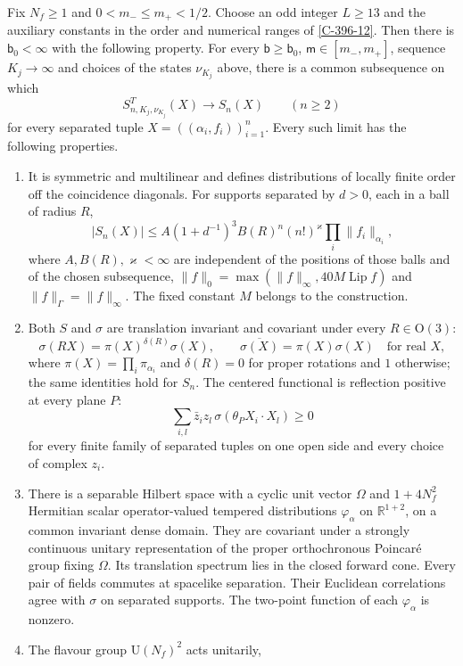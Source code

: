 \documentclass[11pt,letterpaper,reqno]{amsart}
\makeatletter
\theoremstyle{definition}
\newcommand{\ms@majorstart}{%
  \pushQED{\qed}\renewcommand{\qedsymbol}{$\blacksquare\square$}}
\newenvironment{theorem}[1][]{\ms@majorstart\ms@theorem[#1]}
  {\popQED\endms@theorem}
\theoremstyle{remark}
\makeatother
\begin{document}
\begin{theorem}[The massive two-colour theory]\label{C-396-28}
Fix $N_f\ge1$ and $0<m_-\le m_+<1/2$. Choose an odd
integer $L\ge13$ and the auxiliary constants in the order and
numerical ranges of \cref{C-396-12}. Then there is
$\mathsf b_0<\infty$ with the following property.
For every $\mathsf b\ge\mathsf b_0$,
$\mathsf m\in[m_-,m_+]$, sequence $K_j\to\infty$ and choices
of the states $\nu_{K_j}$ above, there is a common subsequence
on which
\[
 S^T_{n,K_j,\nu_{K_j}}(X)\longrightarrow S_n(X)
           \qquad(n\ge2)
\]
for every separated tuple $X=((\alpha_i,f_i))_{i=1}^n$.
Every such limit has the following properties.
\begin{enumerate}[label=\textup{(\roman*)}]
\item It is symmetric and multilinear and defines distributions
of locally finite order off the coincidence diagonals.
For supports separated by $d>0$, each in a ball of radius $R$,
\[
 |S_n(X)|\le A(1+d^{-1})^3B(R)^n(n!)^{\varkappa}
                         \prod_i\|f_i\|_{\alpha_i},
\]
where $A,B(R),\varkappa<\infty$ are independent of the positions
of those balls and of the chosen subsequence,
$\|f\|_0=\max(\|f\|_\infty,40M\operatorname{Lip}f)$ and
$\|f\|_\Gamma=\|f\|_\infty$. The fixed constant $M$ belongs
to the construction.
\item Both $S$ and $\sigma$ are translation invariant and
covariant under every $R\in\mathrm O(3)$:
\[
 \sigma(RX)=\pi(X)^{\delta(R)}\sigma(X),\qquad
 \overline{\sigma(X)}=\pi(X)\sigma(X)
 \quad\text{for real }X,
\]
where $\pi(X)=\prod_i\pi_{\alpha_i}$ and
$\delta(R)=0$ for proper rotations and $1$ otherwise;
the same identities hold for $S_n$.
The centered functional is reflection positive at every plane $P$:
\[
 \sum_{i,l}\bar z_i z_l\,
              \sigma(\theta_PX_i\cdot X_l)\ge0
\]
for every finite family of separated tuples on one open side
and every choice of complex $z_i$.
\item There is a separable Hilbert space with a cyclic unit vector
$\Omega$ and $1+4N_f^2$ Hermitian scalar operator-valued tempered
distributions $\varphi_\alpha$ on $\mathbb R^{1+2}$, on a common
invariant dense domain. They are covariant under a strongly
continuous unitary representation of the proper orthochronous
Poincar\'e group fixing $\Omega$. Its translation spectrum lies
in the closed forward cone. Every pair of fields commutes at
spacelike separation. Their Euclidean correlations agree with
$\sigma$ on separated supports. The two-point function of
each $\varphi_\alpha$ is nonzero.
\item The flavour group $\mathrm U(N_f)^2$ acts unitarily,

\end{enumerate}
\end{theorem}
\end{document}
